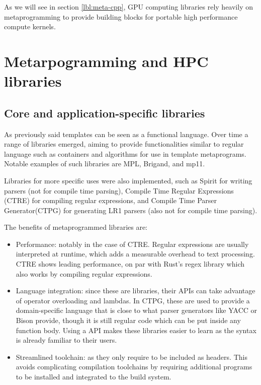 \documentclass[../main]{subfiles}
\begin{document}
As we will see in section \ref{lbl:meta-cpp}, GPU computing libraries
rely heavily on \cpp metaprogramming to provide building blocks for
portable high performance compute kernels.

\section{
  Metarpogramming and HPC libraries
}
\label{lbl:meta-libraries}

\subsection{Core and application-specific libraries}

As previously said \cpp templates can be seen as a functional language.
Over time a range of libraries emerged, aiming to provide functionalities
similar to regular language such as containers and algorithms for use in
template metaprograms. Notable examples of such libraries are MPL\cite{mpl},
Brigand\cite{brigand}, and mp11\cite{mp11}.

Libraries for more specific uses were also implemented, such as
Spirit\cite{spirit} for writing parsers (not for compile time parsing),
Compile Time Regular Expressions (CTRE)\cite{ctre}
for compiling regular expressions,
and Compile Time Parser Generator(CTPG)\cite{ctpg}
for generating LR1 parsers (also not for compile time parsing).

The benefits of metaprogrammed libraries are:

\begin{itemize}

\item Performance: notably in the case of CTRE.
Regular expressions are usually interpreted at runtime,
which adds a measurable overhead to text processing.
CTRE shows leading performance, on par with Rust's regex library
which also works by compiling regular expressions.

\item Language integration: since these are \cpp libraries,
their APIs can take advantage of \cpp operator overloading and lambdas.
In CTPG, these are used to provide a domain-specific language that is close to
what parser generators like YACC or Bison provide,
though it is still regular \cpp code which can be put inside any function body.
Using a \cpp API makes these libraries easier to learn
as the syntax is already familiar to their users.

\item Streamlined toolchain: as they only require to be included as headers.
This avoids complicating compilation toolchains by requiring additional programs
to be installed and integrated to the build system.

\end{itemize}
\end{document}
